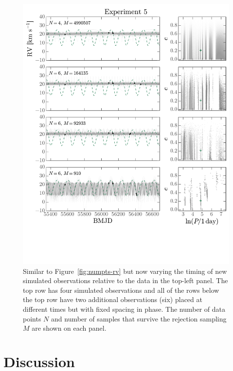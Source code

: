 \documentclass[manuscript, letterpaper]{aastex6}
\newcommand{\figname}{Figure}
\begin{document}
\begin{figure}[p]
\begin{center}
\includegraphics[width=\textwidth]{figures/obsplan-rv-curves.pdf}
\end{center}
\caption{%
Similar to \figname~\ref{fig:numpts-rv} but now varying the timing of new
simulated observations relative to the data in the top-left panel.
The top row has four simulated observations and all of the rows below the top
row have two additional observations (six) placed at different times but with
fixed spacing in phase.
The number of data points $N$ and number of samples that survive the rejection
sampling $M$ are shown on each panel.
\label{fig:obsplan-rv}}
\end{figure}

\section{Discussion} \label{sec:discussion}
\end{document}
